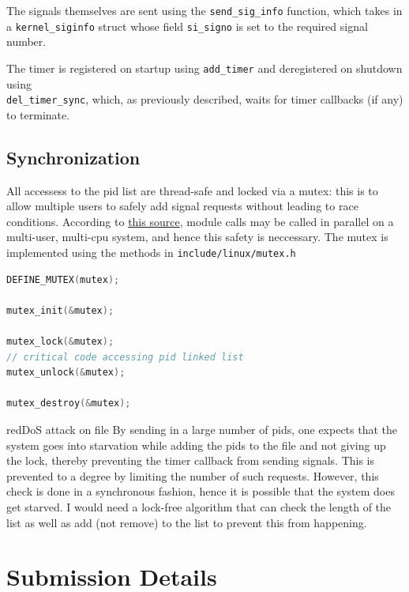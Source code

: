 \documentclass[12pt]{article}
\begin{document}
The signals themselves are sent using the \texttt{send\_sig\_info} function,
which takes in a \texttt{kernel\_siginfo} struct whose field \texttt{si\_signo}
is set to the required signal number. 

The timer is registered on startup using \texttt{add\_timer} and deregistered 
on shutdown using \\ \texttt{del\_timer\_sync}, which, as previously described,
waits for timer callbacks (if any) to terminate.

\subsection{Synchronization}

All accessess to the pid list are thread-safe and locked via a mutex: this is
to allow multiple users to safely add signal requests without leading to race
conditions. According to \href{https://unix.stackexchange.com/questions/186355/few-questions-about-system-calls-and-kernel-modules-kernel-services-in-parallel}
{this source}, module calls may be called in parallel on a multi-user, multi-cpu 
system, and hence this safety is neccessary. The mutex is implemented using
the methods in \texttt{include/linux/mutex.h}

\begin{lstlisting}[language=C]
DEFINE_MUTEX(mutex);

mutex_init(&mutex);

mutex_lock(&mutex);
// critical code accessing pid linked list
mutex_unlock(&mutex);

mutex_destroy(&mutex);
\end{lstlisting}

\begin{mybox}{red}{DoS attack on file}
By sending in a large number of pids, one expects that the system goes into 
starvation while adding the pids to the file and not giving up the lock, thereby
preventing the timer callback from sending signals. This is prevented to a degree
by limiting the number of such requests. However, this check is done in a
synchronous fashion, hence it is possible that the system does get starved. I
would need a lock-free algorithm that can check the length of the list as well
as add (not remove) to the list to prevent this from happening.
\end{mybox}

\section{Submission Details}
\end{document}
